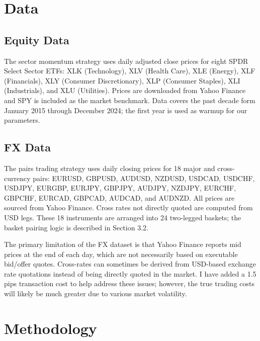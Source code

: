 \documentclass[12pt]{article}
\begin{document}
\section{Data}

\subsection{Equity Data}

The sector momentum strategy uses daily adjusted close prices for eight SPDR Select Sector ETFs: XLK (Technology), XLV (Health Care), XLE (Energy), XLF (Financials), XLY (Consumer Discretionary), XLP (Consumer Staples), XLI (Industrials), and XLU (Utilities). Prices are downloaded from Yahoo Finance and SPY is included as the market benchmark. Data covers the past decade form January 2015 through December 2024; the first year is used as warmup for our parameters.

\subsection{FX Data}

The pairs trading strategy uses daily closing prices for 18 major and cross-currency pairs: EURUSD, GBPUSD, AUDUSD, NZDUSD, USDCAD, USDCHF, USDJPY, EURGBP, EURJPY, GBPJPY, AUDJPY, NZDJPY, EURCHF, GBPCHF, EURCAD, GBPCAD, AUDCAD, and AUDNZD. All prices are sourced from Yahoo Finance. Cross rates not directly quoted are computed from USD legs. These 18 instruments are arranged into 24 two-legged baskets; the basket pairing logic is described in Section 3.2.

The primary limitation of the FX dataset is that Yahoo Finance reports mid prices at the end of each day, which are not necessarily based on executable bid/offer quotes. Cross-rates can sometimes be derived from USD-based exchange rate quotations instead of being directly quoted in the market. I have added a 1.5 pips transaction cost to help address these issues; however, the true trading costs will likely be much greater due to various market volatility.

\section{Methodology}
\end{document}
